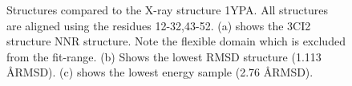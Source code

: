 \begin{figure}%
    \centering
    \caption{Structures compared to the X-ray structure 1YPA. All structures are aligned using the residues 12-32,43-52. (a) shows the 3CI2 structure NNR structure. Note the flexible domain which is excluded from the fit-range. (b) Shows the lowest RMSD structure (1.113 \AA RMSD). (c) shows the lowest energy sample (2.76 \AA RMSD). }
    \label{fig:ci2}%
\end{figure}


